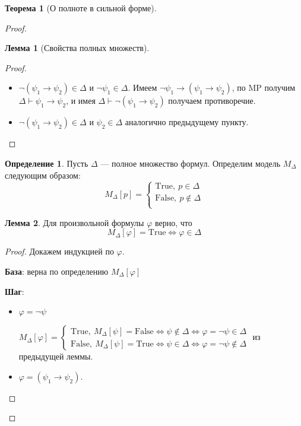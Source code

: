 \documentclass[12pt]{article}
\let\im\rightarrow
\let\n\neg
\let\nin\notin
\theoremstyle{definition}
\newtheorem{definition}{Определение}[section]
\newtheorem{theorem}{Теорема}[section]
\theoremstyle{statement}
\theoremstyle{theorem}
\newtheorem{lemma}{Лемма}[section]
\begin{document}
\begin{theorem}[О полноте в сильной форме]
\begin{proof}
\begin{lemma}[Свойства полных множеств]
\begin{proof}
\begin{itemize}
\begin{itemize}
              \item $\n(\psi_1 \im \psi_2) \in \Delta$ и $\n \psi_1 \in
                \Delta$. Имеем $\n \psi_1 \im (\psi_1 \im \psi_2)$, по MP
                получим $\Delta \vdash \psi_1 \im \psi_2$, и имея $\Delta
                \vdash \n (\psi_1 \im \psi_2)$ получаем противоречие.

              \item $\n(\psi_1 \im \psi_2) \in \Delta$ и $\psi_2 \in
                \Delta$ аналогично предыдущему пункту.
            \end{itemize}
        \end{itemize}
      \end{proof}
    \end{lemma}

    \begin{definition}
      Пусть $\Delta$ --- полное множество формул. Определим модель
      $M_\Delta$ следующим образом:
      \[
        M_\Delta[p] =
        \begin{cases}
          \mathrm{True},\ p \in \Delta\\
          \mathrm{False},\ p \nin \Delta\\
        \end{cases}
      \]
    \end{definition}

    \begin{lemma}
      Для произвольной формулы $\varphi$ верно, что
      \[
        M_\Delta[\varphi] = \mathrm{True} \iff \varphi \in \Delta
      \]
      \begin{proof}
        Докажем индукцией по $\varphi$.

        \textbf{База}: верна по определению $M_\Delta[\varphi]$

        \textbf{Шаг}:
        \begin{itemize}
          \item $\varphi = \n \psi$

            $M_\Delta[\varphi] =
            \begin{cases}
              \mathrm{True},\ M_\Delta[\psi] = \mathrm{False} \iff \psi
              \nin \Delta \iff \varphi = \n \psi \in \Delta\\
              \mathrm{False},\ M_\Delta[\psi] = \mathrm{True} \iff \psi
              \in \Delta \iff \varphi = \n \psi \nin \Delta
            \end{cases}$ из предыдущей леммы.

          \item $\varphi = (\psi_1 \im \psi_2)$.


\end{itemize}
\end{proof}
\end{lemma}
\end{proof}
\end{theorem}
\end{document}
